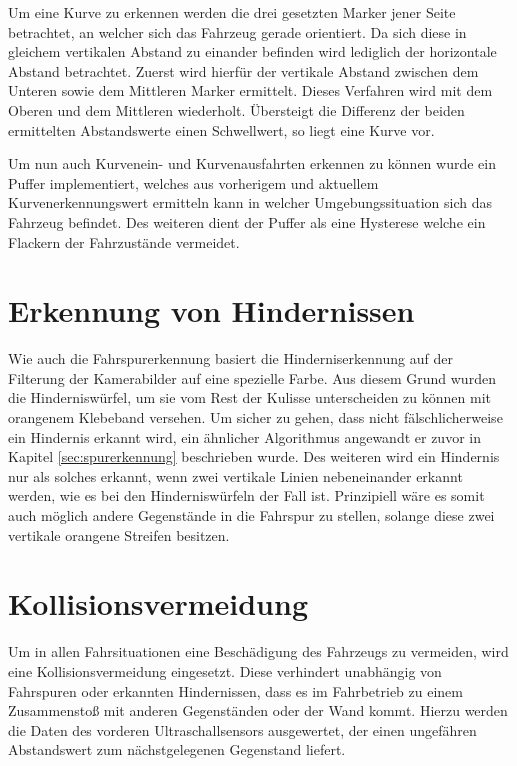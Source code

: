 Um eine Kurve zu erkennen werden die drei gesetzten Marker jener Seite betrachtet, an welcher sich das Fahrzeug gerade orientiert. Da sich diese in gleichem vertikalen Abstand zu einander befinden wird lediglich der horizontale Abstand betrachtet. Zuerst wird hierfür der vertikale Abstand zwischen dem Unteren sowie dem Mittleren Marker ermittelt. Dieses Verfahren wird mit dem Oberen und dem Mittleren wiederholt. Übersteigt die Differenz der beiden ermittelten Abstandswerte einen Schwellwert, so liegt eine Kurve vor.

Um nun auch Kurvenein- und Kurvenausfahrten erkennen zu können wurde ein Puffer implementiert, welches aus vorherigem und aktuellem Kurvenerkennungswert ermitteln kann in welcher Umgebungssituation sich das Fahrzeug befindet. Des weiteren dient der Puffer als eine Hysterese welche ein Flackern der Fahrzustände vermeidet.


\section{Erkennung von Hindernissen}
\label{sec:hinderniserkennung}

Wie auch die Fahrspurerkennung basiert die Hinderniserkennung auf der Filterung der Kamerabilder auf eine spezielle Farbe. Aus diesem Grund wurden die Hinderniswürfel, um sie vom Rest der Kulisse unterscheiden zu können mit orangenem Klebeband versehen. Um sicher zu gehen, dass nicht fälschlicherweise ein Hindernis erkannt wird, ein ähnlicher Algorithmus angewandt er zuvor in Kapitel \ref{sec:spurerkennung} beschrieben wurde. Des weiteren wird ein Hindernis nur als solches erkannt, wenn zwei vertikale Linien nebeneinander erkannt werden, wie es bei den Hinderniswürfeln der Fall ist. Prinzipiell wäre es somit auch möglich andere Gegenstände in die Fahrspur zu stellen, solange diese zwei vertikale orangene Streifen besitzen.

\section{Kollisionsvermeidung}
\label{sec:kollision}

Um in allen Fahrsituationen eine Beschädigung des Fahrzeugs zu vermeiden, wird eine Kollisionsvermeidung eingesetzt. Diese verhindert unabhängig von Fahrspuren oder erkannten Hindernissen, dass es im Fahrbetrieb zu einem Zusammenstoß mit anderen Gegenständen oder der Wand kommt. Hierzu werden die Daten des vorderen Ultraschallsensors ausgewertet, der einen ungefähren Abstandswert zum nächstgelegenen Gegenstand liefert.

